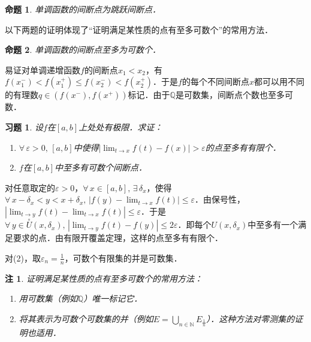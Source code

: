 \documentclass[11pt,a4paper]{ctexart}
\makeatletter
\theoremstyle{thmseries} %
\newtheorem{prop}{命题}[section]
\theoremstyle{exerseries}
\newtheorem{exer}{习题}[section]
\newtheorem*{rem}{注}
\renewenvironment{proof}[1][\proofname]{\par
  \pushQED{\qed}%
  \normalfont \topsep6\p@\@plus6\p@\relax
  \trivlist
  \item[\hskip\labelsep
        \itshape
    #1\@addpunct{}]\ignorespaces
}{%
  \popQED\endtrivlist\@endpefalse
}
\newenvironment{pf}{\begin{proof}[\bfseries\upshape 证\quad]}{\end{proof}}
\newcommand{\bra}[1]{\mathopen{}\left(#1\right)}
\renewcommand{\epsilon}{\varepsilon}
\newcommand{\dnei}{\overset{\circ}{U}}
\newcommand{\N}{\mathbb{N}}
\newcommand{\Q}{\mathbb{Q}}
\makeatother
\begin{document}
\begin{prop}
	单调函数的间断点为跳跃间断点．
\end{prop}

以下两题的证明体现了``证明满足某性质的点有至多可数个''的常用方法．
\begin{prop}
	单调函数的间断点至多为可数个．
\end{prop}
\begin{pf}
	易证对单调递增函数$f$的间断点$x_1<x_2$，有$f(x_1^-)<f(x_1^+)\leq f(x_2^-)<f(x_2^+)$．于是$f$的每个不同间断点$x$都可以用不同的有理数$q\in\bra{f(x^-),f(x^+)}$标记．由于$\Q$是可数集，间断点个数也至多可数．
\end{pf}

\begin{exer}
	设$f$在$[a,b]$上处处有极限．求证：
	\begin{enumerate}
		\item $\forall\,\epsilon>0,\,[a,b]$中使得$|\lim_{t\to x}f(t)-f(x)|>\epsilon$的点至多有有限个．
		\item $f$在$[a,b]$中至多有可数个间断点．
	\end{enumerate}
\end{exer}
\begin{pf}
	对任意取定的$\epsilon>0$，$\forall\,x\in[a,b],\,\exists\,\delta_x$，使得$\forall\,x-\delta_x<y<x+\delta_x,\,|f(y)-\lim_{t\to x}f(t)|\leq\epsilon$．由保号性，$|\lim_{t\to y}f(t)-\lim_{t\to x}f(t)|\leq\epsilon$．于是$\forall\,y\in\dnei(x,\delta_x),\,|\lim_{t\to y}f(t)-f(y)|\leq2\epsilon$．即每个$U(x,\delta_x)$中至多有一个满足要求的点．由有限开覆盖定理，这样的点至多有有限个．

	对(2)，取$\epsilon_n=\frac{1}{n}$，可数个有限集的并是可数集．
\end{pf}
\begin{rem}
	证明满足某性质的点有至多可数个的常用方法：
	\begin{enumerate}
		\item 用可数集（例如$\Q$）唯一标记它．
		\item 将其表示为可数个可数集的并（例如$E=\bigcup_{n\in \N}E_{\frac{1}{n}}$）．这种方法对零测集的证明也适用．
	\end{enumerate}
\end{rem}
\end{document}
